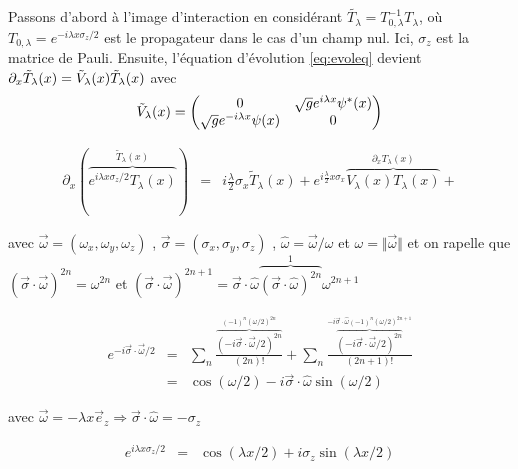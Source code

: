 \documentclass[submission,Phys,10pt]{SciPost}%
\begin{document}
{Passons d'abord à l'image d'interaction en considérant $\tilde{T_\lambda}=T_{0,\lambda}^{-1} T_\lambda$, où $T_{0,\lambda}=e^{-i\lambda x \sigma_z/2}$ est le propagateur dans le cas d'un champ nul. Ici, $\sigma_z$ est la matrice de Pauli. Ensuite, l'équation d'évolution \eqref{eq:evoleq} devient 
$\partial_{x}\Tilde{T}_{\lambda}(x)={\Tilde{V}_{\lambda}(x)}\Tilde{T}_{\lambda}(x)$
avec 
\begin{equation}
\Tilde{V}_{\lambda}(x)=\begin{pmatrix}
    0 & \sqrt{g}e^{i\lambda x}\psi^*(x) \\
    \sqrt{g}e^{-i\lambda x}\psi(x) & 0
    \end{pmatrix}
    \label{eq:Utilde}
    \end{equation}
    
{\color{magenta}
\begin{eqnarray*}
	\partial_x ( \overbrace{ e^{i \lambda x \sigma_z /2 }  T_\lambda ( x )}^{\tilde{T}_\lambda ( x) } ) & = & i \frac{\lambda}{2} \sigma_x  \tilde{T}_\lambda (x) + e^{i\frac{\lambda}{2}x \sigma_x } \overbrace{ V_\lambda (x) T_\lambda (x)}^{ \partial_x T_\lambda (x)} + 
\end{eqnarray*}

avec $\vec{\omega} = ( \omega_x , \omega_y , \omega_z )$ ,  $\vec{\sigma} = ( \sigma_x , \sigma_y , \sigma_z )$ , $ \hat{\omega} = \vec{\omega}/ \omega$ et $\omega = \Vert \vec{\omega} \Vert $ 
et on rapelle que $(\vec{\sigma} \cdot \vec{\omega})^{2n} = \omega^{2n}$ et $(\vec{\sigma} \cdot \vec{\omega})^{2n+1 } = \vec{\sigma} \cdot \hat{\omega} \overbrace{(\vec{\sigma} \cdot \hat{\omega})^{2n}}^{1}  \omega^{2n+1}$

\begin{eqnarray*}
	e^{-i \vec{\sigma} \cdot \vec{\omega} /2 } & = & \sum_n \frac{ \overbrace{(-i \vec{\sigma} \cdot \vec{\omega} /2)^{2n}}^{(-1)^n ( \omega/2) ^{2n}  }}{(2n)!}  + 	\sum_n \frac{ \overbrace{(-i \vec{\sigma} \cdot \vec{\omega} /2)^{2n}}^{-i\vec{\sigma} \cdot \hat{\omega} (-1)^n ( \omega/2) ^{2n+1}  }}{(2n+1)!} \\
	& = & \cos  ( \omega/2 ) - i\vec{\sigma} \cdot \hat{\omega} \sin ( \omega/2 ) 
\end{eqnarray*}

avec $\vec{\omega} = - \lambda x  \vec{e}_z  \Rightarrow \vec{\sigma} \cdot \hat{\omega} = - \sigma_z  $ 

\begin{eqnarray*}
	e^{i \lambda x \sigma_z /2 } & = & 	\cos  ( \lambda x / 2 ) + i \sigma_z  \sin ( \lambda x /2 ) 
\end{eqnarray*}

}}
\end{document}
